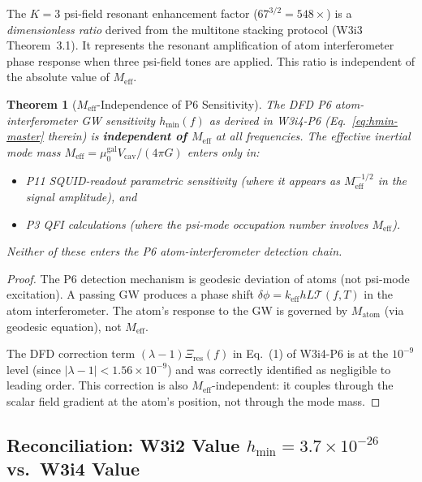 \documentclass[11pt]{article}
\newtheorem{theorem}{Theorem}[section]
\theoremstyle{definition}
\theoremstyle{remark}
\newcommand{\ee}[1]{\times10^{#1}}
\newcommand{\lambdaone}{|\lambda-1|}
\newcommand{\Meff}{M_{\mathrm{eff}}}
\begin{document}
The $K=3$ psi-field resonant enhancement factor ($67^{3/2} = 548\times$) is a
\emph{dimensionless ratio} derived from the multitone stacking protocol
(W3i3 Theorem~3.1). It represents the resonant amplification of atom
interferometer phase response when three psi-field tones are applied.
This ratio is independent of the absolute value of $\Meff$.

\begin{theorem}[$\Meff$-Independence of P6 Sensitivity]
\label{thm:P6_Meff_independence}
The DFD P6 atom-interferometer GW sensitivity $h_{\min}(f)$ as derived in
W3i4-P6 (Eq.~\ref{eq:hmin-master} therein) is \textbf{independent of $\Meff$}
at all frequencies. The effective inertial mode mass $\Meff = \mu_0^{\mathrm{gal}}
V_{\mathrm{cav}}/(4\pi G)$ enters only in:
\begin{itemize}
\item P11 SQUID-readout parametric sensitivity (where it appears as
  $\Meff^{-1/2}$ in the signal amplitude), and
\item P3 QFI calculations (where the psi-mode occupation number involves $\Meff$).
\end{itemize}
Neither of these enters the P6 atom-interferometer detection chain.
\end{theorem}

\begin{proof}
The P6 detection mechanism is geodesic deviation of atoms (not psi-mode
excitation). A passing GW produces a phase shift
$\delta\phi = k_{\mathrm{eff}} h L \mathcal{T}(f,T)$ in the atom
interferometer. The atom's response to the GW is governed by
$M_{\mathrm{atom}}$ (via geodesic equation), not $\Meff$.

The DFD correction term $(\lambda-1)\Xi_{\mathrm{res}}(f)$ in
Eq.~(1) of W3i4-P6 is at the $10^{-9}$ level (since $\lambdaone < 1.56\ee{-9}$)
and was correctly identified as negligible to leading order. This correction
is also $\Meff$-independent: it couples through the scalar field gradient
at the atom's position, not through the mode mass.
\end{proof}

\subsection{Reconciliation: W3i2 Value $h_{\min} = 3.7\ee{-26}$ vs.\ W3i4 Value}
\end{document}
